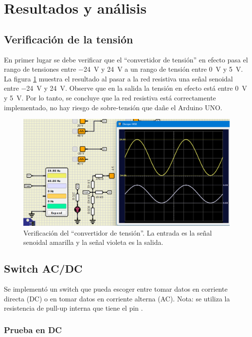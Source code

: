 \section{Resultados y análisis}


\subsection{Verificación de la tensión}
En primer lugar se debe verificar que el ``convertidor de tensión'' en efecto pasa el rango de tensiones entre \SI{-24}{\volt} y \SI{24}{\volt} a un rango de tensión entre \SI{0}{\volt} y \SI{5}{\volt}. La figura \ref{volt-convert} muestra el resultado al pasar a la red resistiva una señal senoidal entre \SI{-24}{\volt} y \SI{24}{\volt}. Observe que en la salida la tensión en efecto está entre \SI{0}{\volt} y \SI{5}{\volt}. Por lo tanto, se concluye que la red resistiva está correctamente implementado, no hay riesgo de sobre-tensión que dañe el Arduino UNO.
\begin{figure}
    \centering
    \includegraphics[width=14cm]{Imagenes/volt.png}
    \caption{Verificación del ``convertidor de tensión''. La entrada es la señal senoidal amarilla y la señal violeta es la salida.}
    \label{volt-convert}
\end{figure}

\subsection{Switch AC/DC}
Se implementó un switch que pueda escoger entre tomar datos en corriente directa (DC) o en tomar datos en corriente alterna (AC). Nota: se utiliza la resistencia de pull-up interna que tiene el pin \cite{pullup}.

\subsubsection{Prueba en DC}

